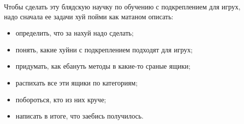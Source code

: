 Чтобы сделать эту блядскую научку по обучению с подкреплением для игрух, надо сначала ее задачи хуй пойми как матаном описать:
\begin{itemize}[label=---]
	\item определить, что за нахуй надо сделать;
	\item понять, какие хуйни с подкреплением подходят для игрух;
	\item придумать, как ебануть методы в какие-то сраные ящики;
	\item распихать все эти ящики по категориям;
	\item побороться, кто из них круче;
	\item написать в итоге, что заебись получилось.
\end{itemize}